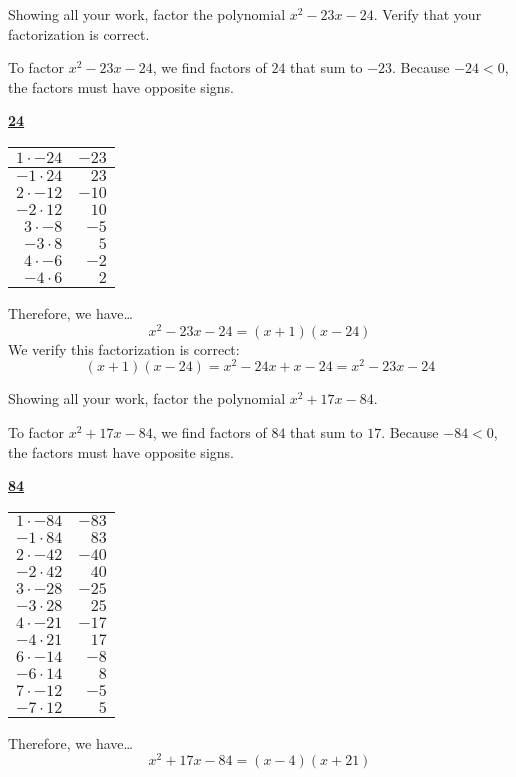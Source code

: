 \documentclass[12pt,letterpaper]{exam}
\begin{document}
\begin{questions}
\newpage
\question[10] Showing all your work, factor the polynomial $x^2 - 23x - 24$. Verify that your factorization is correct. \pspace

\sol To factor $x^2 - 23x - 24$, we find factors of $24$ that sum to $-23$. Because $-24 < 0$, the factors must have opposite signs. \par
	\begin{table}[!ht]
	\centering
	\underline{\bfseries 24} \pvspace{0.2cm}
	\begin{tabular}{rr} \hline
	\multicolumn{1}{|r}{$1 \cdot -24$} & \multicolumn{1}{r|}{$-23$} \\ \hline
	$-1 \cdot 24$ & $23$ \\
	$2 \cdot -12$ & $-10$ \\
	$-2 \cdot 12$ & $10$ \\
	$3 \cdot -8$ & $-5$ \\
	$-3 \cdot 8$ & $5$ \\
	$4 \cdot -6$ & $-2$ \\
	$-4 \cdot 6$ & $2$
	\end{tabular}
	\end{table} \par
Therefore, we have\dots
	\[
	x^2 - 23x - 24= (x + 1)(x - 24)
	\] \pspace
We verify this factorization is correct:
	\[
	(x + 1)(x - 24)= x^2 - 24x + x - 24= x^2 - 23x - 24
	\]



\newpage
\question[10] Showing all your work, factor the polynomial $x^2 + 17x - 84$. \pspace

\sol To factor $x^2 + 17x - 84$, we find factors of $84$ that sum to $17$. Because $-84 < 0$, the factors must have opposite signs. \par
	\begin{table}[!ht]
	\centering
	\underline{\bfseries 84} \pvspace{0.2cm}
	\begin{tabular}{rr} 
	$1 \cdot -84$ & $-83$ \\
	$-1 \cdot 84$ & $83$ \\
	$2 \cdot -42$ & $-40$ \\
	$-2 \cdot 42$ & $40$ \\
	$3 \cdot -28$ & $-25$ \\
	$-3 \cdot 28$ & $25$ \\
	$4 \cdot -21$ & $-17$ \\ \hline
	\multicolumn{1}{|r}{$-4 \cdot 21$} & \multicolumn{1}{r|}{$17$} \\ \hline
	$6 \cdot -14$ & $-8$ \\
	$-6 \cdot 14$ & $8$ \\
	$7 \cdot -12$ & $-5$ \\
	$-7 \cdot 12$ & $5$
	\end{tabular}
	\end{table} \par
Therefore, we have\dots
	\[
	x^2 + 17x - 84= (x - 4)(x + 21)
	\] 




\end{questions}
\end{document}
